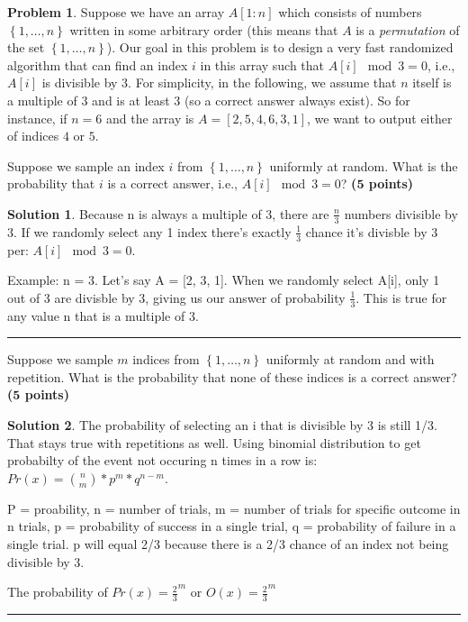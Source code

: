 \documentclass{article}
\theoremstyle{definition}
\newtheorem{problem}{Problem}
\def\fline{\rule{0.75\linewidth}{0.5pt}}
\newcommand{\finishline}{\begin{center}\fline\end{center}}
\newtheorem*{solution*}{Solution}
\newenvironment{solution}{\begin{solution*}}{{\finishline} \end{solution*}}
\newcommand{\grade}[1]{\hfill{\textbf{($\mathbf{#1}$ points)}}}
\newcommand{\set}[1]{\ensuremath{\left\{ #1 \right\}}}
\begin{document}
\begin{problem}
Suppose we have an array $A[1:n]$ which consists of numbers $\set{1,\ldots,n}$ written in some arbitrary order (this means that $A$ is a \emph{permutation} of the set $\set{1,\ldots,n}$). 
Our goal in this problem is to design a very fast randomized algorithm that can find an index $i$ in this array such that $A[i] \mod 3 = 0$, i.e., $A[i]$ is divisible by $3$. For simplicity, in the following, we assume that $n$ itself is a multiple of $3$ and 
is at least $3$ (so a correct answer always exist). 
So for instance, if $n=6$ and the array is $A=[2,5,4,6,3,1]$, we want to output either of indices $4$ or $5$. 

\begin{enumerate}
\item[(a)]	Suppose we sample an index $i$ from $\set{1,\ldots,n}$ uniformly at random. What is the probability that $i$ is a correct answer, i.e., $A[i] \mod 3 = 0$? \grade{5} 


	\begin{solution}
		\item Because n is always a multiple of 3, there are $\frac{n}{3}$ numbers divisible by 3. If we randomly select any 1 index there's exactly $\frac{1}{3}$ chance it's divisble by 3 per: $A[i] \mod 3 = 0$.
		\item Example: n = 3. Let's say A = [2, 3, 1]. When we randomly select A[i], only 1 out of 3 are divisble by 3, giving us our answer of probability  $\frac{1}{3}$. This is true for any value n that is a multiple of 3.
	\end{solution}
	
\item[(b)] Suppose we sample $m$ indices from $\set{1,\ldots,n}$ uniformly at random and with repetition. What is the probability that none of these indices is a correct answer?  \grade{5}


	\begin{solution}
		\item The probability of selecting an i that is divisible by 3 is still 1/3. That stays true with repetitions as well. Using binomial distribution to get probabilty of the event not occuring n times in a row is: $Pr(x) = {n \choose m} * {p^m }* {q^{n - m}}$. 
		\item P = proability, n = number of trials, m = number of trials for specific outcome in n trials, p = probability of success in a single trial, q = probability of failure in a single trial. p will equal 2/3 because there is a 2/3 chance of an index not being divisible by 3.
	\item The probability of $Pr(x) = {\frac{2}{3}}^m$ or $O(x) =  {\frac{2}{3}}^m$
	\end{solution}
	

\end{enumerate}
\end{problem}
\end{document}

